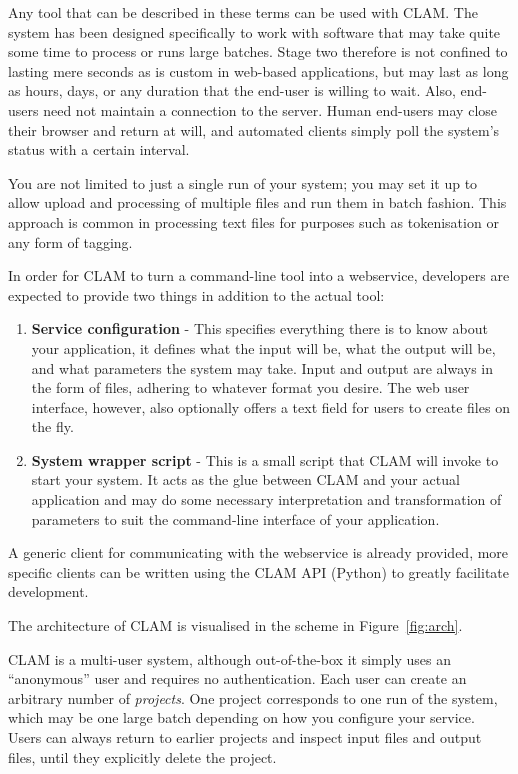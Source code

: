 \documentclass[11pt]{article}
\begin{document}
Any tool that can be described in these terms can be used with CLAM. The system
has been designed specifically to work with software that may take quite some
time to process or runs large batches. Stage two therefore is not confined to
lasting mere seconds as is custom in web-based applications, but may last as
long as hours, days, or any duration that the end-user is willing to wait.
Also, end-users need not maintain a connection to the server. Human end-users
may close their browser and return at will, and automated clients simply poll the
system's status with a certain interval.

You are not limited to just a single run of your system; you may set it up to
allow upload and processing of multiple files and run them in batch fashion.
This approach is common in processing text files for purposes such as
tokenisation or any form of tagging.

In order for CLAM to turn a command-line tool into a webservice, developers are
expected to provide two things in addition to the actual tool: 

\begin{enumerate}
  \item \textbf{Service configuration} - This specifies everything there is to
    know about your application, it defines what the input will be, what
    the output will be, and what parameters the system may take. Input and output
    are always in the form of files, adhering to whatever format you desire. The web user interface, however, also
    optionally offers a text field for users to create files on the fly. 
    
  \item \textbf{System wrapper script} - This is a small script that CLAM will
    invoke to start your system. It acts as the glue between CLAM and your
    actual application and may do some necessary interpretation and
    transformation of parameters to suit the command-line interface of your
    application.
\end{enumerate}

A generic client for communicating with the webservice is already provided,
more specific clients can be written using the CLAM API (Python) to greatly
facilitate development.

The architecture of CLAM is visualised in the scheme in Figure~\ref{fig:arch}.


CLAM is a multi-user system, although out-of-the-box it simply uses an
``anonymous'' user and requires no authentication. Each user can create an
arbitrary number of \emph{projects}. One project corresponds to one run of the
system, which may be one large batch depending on how you configure your
service. Users can always return to earlier projects and inspect input files
and output files, until they explicitly delete the project.
\end{document}
